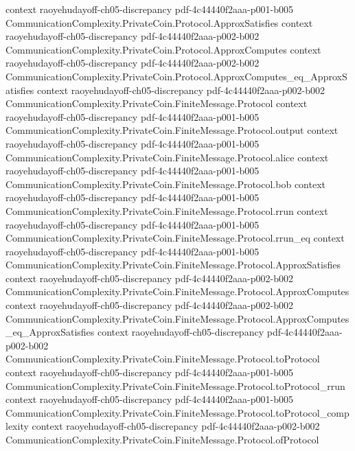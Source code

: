 \begin{lemma}
  {context}
  {raoyehudayoff-ch05-discrepancy}
  {pdf-4c44440f2aaa-p001-b005}
\proofstep
  {CommunicationComplexity.PrivateCoin.Protocol.ApproxSatisfies}
  {context}
  {raoyehudayoff-ch05-discrepancy}
  {pdf-4c44440f2aaa-p002-b002}
\proofstep
  {CommunicationComplexity.PrivateCoin.Protocol.ApproxComputes}
  {context}
  {raoyehudayoff-ch05-discrepancy}
  {pdf-4c44440f2aaa-p002-b002}
\proofstep
  {CommunicationComplexity.PrivateCoin.Protocol.ApproxComputes_eq_ApproxSatisfies}
  {context}
  {raoyehudayoff-ch05-discrepancy}
  {pdf-4c44440f2aaa-p002-b002}
\proofstep
  {CommunicationComplexity.PrivateCoin.FiniteMessage.Protocol}
  {context}
  {raoyehudayoff-ch05-discrepancy}
  {pdf-4c44440f2aaa-p001-b005}
\proofstep
  {CommunicationComplexity.PrivateCoin.FiniteMessage.Protocol.output}
  {context}
  {raoyehudayoff-ch05-discrepancy}
  {pdf-4c44440f2aaa-p001-b005}
\proofstep
  {CommunicationComplexity.PrivateCoin.FiniteMessage.Protocol.alice}
  {context}
  {raoyehudayoff-ch05-discrepancy}
  {pdf-4c44440f2aaa-p001-b005}
\proofstep
  {CommunicationComplexity.PrivateCoin.FiniteMessage.Protocol.bob}
  {context}
  {raoyehudayoff-ch05-discrepancy}
  {pdf-4c44440f2aaa-p001-b005}
\proofstep
  {CommunicationComplexity.PrivateCoin.FiniteMessage.Protocol.rrun}
  {context}
  {raoyehudayoff-ch05-discrepancy}
  {pdf-4c44440f2aaa-p001-b005}
\proofstep
  {CommunicationComplexity.PrivateCoin.FiniteMessage.Protocol.rrun_eq}
  {context}
  {raoyehudayoff-ch05-discrepancy}
  {pdf-4c44440f2aaa-p001-b005}
\proofstep
  {CommunicationComplexity.PrivateCoin.FiniteMessage.Protocol.ApproxSatisfies}
  {context}
  {raoyehudayoff-ch05-discrepancy}
  {pdf-4c44440f2aaa-p002-b002}
\proofstep
  {CommunicationComplexity.PrivateCoin.FiniteMessage.Protocol.ApproxComputes}
  {context}
  {raoyehudayoff-ch05-discrepancy}
  {pdf-4c44440f2aaa-p002-b002}
\proofstep
  {CommunicationComplexity.PrivateCoin.FiniteMessage.Protocol.ApproxComputes_eq_ApproxSatisfies}
  {context}
  {raoyehudayoff-ch05-discrepancy}
  {pdf-4c44440f2aaa-p002-b002}
\proofstep
  {CommunicationComplexity.PrivateCoin.FiniteMessage.Protocol.toProtocol}
  {context}
  {raoyehudayoff-ch05-discrepancy}
  {pdf-4c44440f2aaa-p001-b005}
\proofstep
  {CommunicationComplexity.PrivateCoin.FiniteMessage.Protocol.toProtocol_rrun}
  {context}
  {raoyehudayoff-ch05-discrepancy}
  {pdf-4c44440f2aaa-p001-b005}
\proofstep
  {CommunicationComplexity.PrivateCoin.FiniteMessage.Protocol.toProtocol_complexity}
  {context}
  {raoyehudayoff-ch05-discrepancy}
  {pdf-4c44440f2aaa-p002-b002}
\proofstep
  {CommunicationComplexity.PrivateCoin.FiniteMessage.Protocol.ofProtocol}

\end{lemma}
